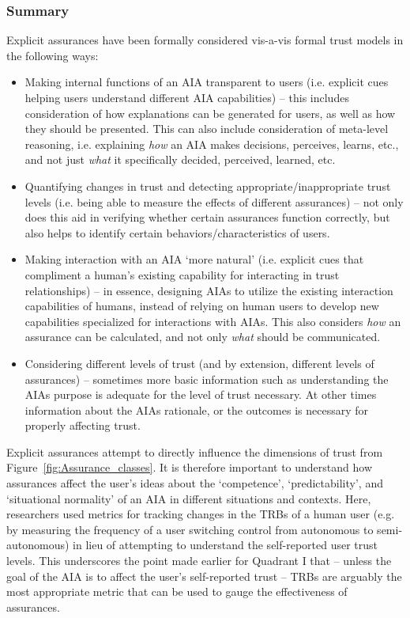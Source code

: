 \subsubsection{Summary}
Explicit assurances have been formally considered vis-a-vis formal trust models in the following ways:
\begin{itemize}
    \item Making internal functions of an AIA transparent to users (i.e. explicit cues helping users understand different AIA capabilities) -- this includes consideration of how explanations can be generated for users, as well as how they should be presented. This can also include consideration of meta-level reasoning, i.e. explaining \textit{how} an AIA makes decisions, perceives, learns, etc., and not just \textit{what} it specifically decided, perceived, learned, etc. 
    \item Quantifying changes in trust and detecting appropriate/inappropriate trust levels (i.e. being able to measure the effects of different assurances) -- not only does this aid in verifying whether certain assurances function correctly, but also helps to identify certain behaviors/characteristics of users.
    \item Making interaction with an AIA `more natural' (i.e. explicit cues that compliment a human's existing capability for interacting in trust relationships) -- in essence, designing AIAs to utilize the existing interaction capabilities of humans, instead of relying on human users to develop new capabilities specialized for interactions with AIAs. This also considers \emph{how} an assurance can be calculated, and not only \emph{what} should be communicated. 
    \item Considering different levels of trust (and by extension, different levels of assurances) -- sometimes more basic information such as understanding the AIAs purpose is adequate for the level of trust necessary. At other times information about the AIAs rationale, or the outcomes is necessary for properly affecting trust.
\end{itemize}

Explicit assurances attempt to directly influence the dimensions of trust from Figure~\ref{fig:Assurance_classes}. 
It is therefore important to understand how assurances affect the user's ideas about the `competence', `predictability', and `situational normality' of an AIA in different situations and contexts. 
Here, researchers used metrics for tracking changes in the TRBs of a human user (e.g. by measuring the frequency of a user switching control from autonomous to semi-autonomous) in lieu of attempting to understand the self-reported user trust levels. 
This underscores the point made earlier for Quadrant I that -- unless the goal of the AIA is to affect the user's self-reported trust -- TRBs are arguably the most appropriate metric that can be used to gauge the effectiveness of assurances. %
